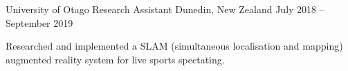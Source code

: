 \begin{cventries}
  \cventry
    {University of Otago} %
    {Research Assistant} %
    {Dunedin, New Zealand} %
    {July 2018 – September 2019} %
    {
      \begin{cvitems} %
        \item {
			 Researched and implemented a SLAM (simultaneous localisation and mapping) augmented reality system for live sports spectating. 
		}
      \end{cvitems}
    }




\end{cventries}

